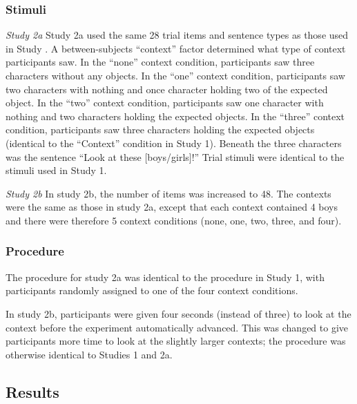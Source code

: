 \documentclass[10pt,letterpaper]{article}
\begin{document}
\subsubsection{Stimuli}
\emph{Study 2a}
Study 2a used the same 28 trial items and sentence types as those used in Study .  A between-subjects ``context'' factor determined what type of context participants saw.  In the ``none'' context condition, participants saw three characters without any objects.  In the ``one'' context condition, participants saw two characters with nothing and once character holding two of the expected object.  In the ``two'' context condition, participants saw one character with nothing and two characters holding the expected objects.  In the ``three'' context condition, participants saw three characters holding the expected objects (identical to the ``Context'' condition in Study 1).  Beneath the three characters was the sentence ``Look at these [boys/girls]!''  Trial stimuli were identical to the stimuli used in Study 1.  

\emph{Study 2b}
In study 2b, the number of items was increased to 48.  The contexts were the same as those in study 2a, except that each context contained 4 boys and there were therefore 5 context conditions (none, one, two, three, and four).  

\subsubsection{Procedure}
 The procedure for study 2a was identical to the procedure in Study 1, with participants randomly assigned to one of the four context conditions.  
 
 In study 2b, participants were given four seconds (instead of three) to look at the context before the experiment automatically advanced.  This was changed to give participants more time to look at the slightly larger contexts; the procedure was otherwise identical to Studies 1 and 2a.  
 
\subsection{Results}
\end{document}
